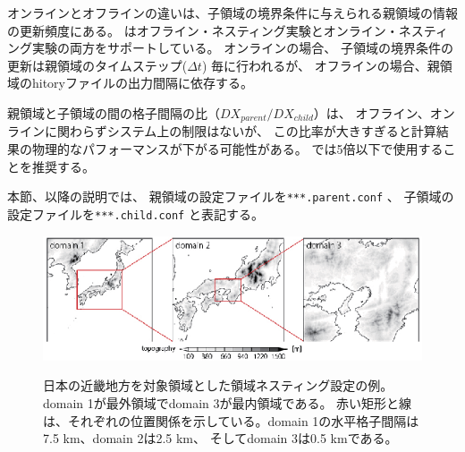 オンラインとオフラインの違いは、子領域の境界条件に与えられる親領域の情報の更新頻度にある。
\scalerm はオフライン・ネスティング実験とオンライン・ネスティング実験の両方をサポートしている。
オンラインの場合、
子領域の境界条件の更新は親領域のタイムステップ($\Delta t$) 毎に行われるが、
オフラインの場合、親領域のhitoryファイルの出力間隔に依存する。

親領域と子領域の間の格子間隔の比（$DX_{parent}/DX_{child}$）は、
オフライン、オンラインに関わらずシステム上の制限はないが、
この比率が大きすぎると計算結果の物理的なパフォーマンスが下がる可能性がある。
\scalerm では5倍以下で使用することを推奨する。

本節、以降の説明では、
親領域の設定ファイルを\verb|***.parent.conf| 、
子領域の設定ファイルを\verb|***.child.conf| と表記する。

\begin{figure}[t]
\begin{center}
  \includegraphics[width=1.0\hsize]{./figure/nesting_sample.eps}\\
  \caption{日本の近畿地方を対象領域とした領域ネスティング設定の例。 
    domain 1が最外領域でdomain 3が最内領域である。
    赤い矩形と線は、それぞれの位置関係を示している。domain 1の水平格子間隔は7.5 km、domain 2は2.5 km、
    そしてdomain 3は0.5 kmである。}
  \label{fig_nestsample}
\end{center}
\end{figure}


~~\\
~~\\


